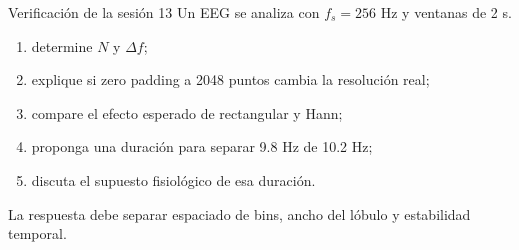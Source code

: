 \documentclass[
  ignorenonframetext,
  aspectratio=169,
  spanish,
]{beamer}
\providecommand{\tightlist}{%
  \setlength{\itemsep}{0pt}\setlength{\parskip}{0pt}}
\begin{document}
\begin{frame}{Verificación de la sesión 13}
  \protect{}\label{verificaciuxf3n-de-la-sesiuxf3n-13}
  Un EEG se analiza con \(f_s=256\) Hz y ventanas de 2 s.

  \begin{enumerate}
    \tightlist
    \item
          determine \(N\) y \(\Delta f\);
    \item
          explique si zero padding a 2048 puntos cambia la resolución real;
    \item
          compare el efecto esperado de rectangular y Hann;
    \item
          proponga una duración para separar 9.8 Hz de 10.2 Hz;
    \item
          discuta el supuesto fisiológico de esa duración.
  \end{enumerate}

  \begin{tcolorbox}[enhanced jigsaw, arc=.35mm, bottomrule=.15mm, bottomtitle=1mm, breakable, colback=white, colbacktitle=quarto-callout-tip-color!10!white, colframe=quarto-callout-tip-color-frame, coltitle=black, left=2mm, leftrule=.75mm, opacityback=0, opacitybacktitle=0.6, rightrule=.15mm, title=\textcolor{quarto-callout-tip-color}{\faLightbulb}\hspace{0.5em}{Criterio de logro}, titlerule=0mm, toprule=.15mm, toptitle=1mm]

    La respuesta debe separar espaciado de bins, ancho del lóbulo y
    estabilidad temporal.

  \end{tcolorbox}
\end{frame}
\end{document}
